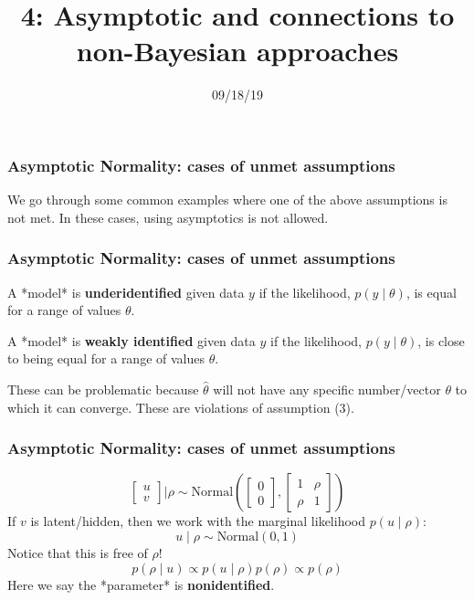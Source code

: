 \documentclass{beamer}
\title["4"]{4: Asymptotic and connections to non-Bayesian approaches}
\date{09/18/19}
\begin{document}

\begin{frame}
\titlepage 
\end{frame}

\begin{frame}
\frametitle{Asymptotic Normality: cases of unmet assumptions}

We go through some common examples where one of the above assumptions is not met. In these cases, using asymptotics is not allowed.

\end{frame}



\begin{frame}
\frametitle{Asymptotic Normality: cases of unmet assumptions}

A *model* is {\bf underidentified} given data $y$ if the likelihood, $p(y \mid \theta)$, is equal for a range of values $\theta$. 
\newline

A *model* is {\bf weakly identified} given data $y$ if the likelihood, $p(y \mid \theta)$, is close to being equal for a range of values $\theta$. 
\newline

These can be problematic because $\hat{\theta}$ will not have any specific number/vector $\theta$ to which it can converge. These are violations of assumption (3).

\end{frame}

\begin{frame}
\frametitle{Asymptotic Normality: cases of unmet assumptions}

\[
\left[\begin{array}{c}
u \\
v
\end{array}\right]
\bigg|
\rho
\sim
\text{Normal}\left( 
\left[\begin{array}{c}
0 \\
0
\end{array}\right]
,
\left[\begin{array}{cc}
1 & \rho \\
\rho & 1
\end{array}\right]
\right)
\]
If $v$ is latent/hidden, then we work with the marginal likelihood $p(u \mid \rho)$:
\[
u \mid \rho \sim \text{Normal}\left(0, 1 \right)
\]
Notice that this is free of $\rho$! 
\[
p(\rho \mid u) \propto p(u \mid \rho) p(\rho) \propto p(\rho)
\]
Here we say the *parameter* is {\bf nonidentified}.

\end{frame}
\end{document}
